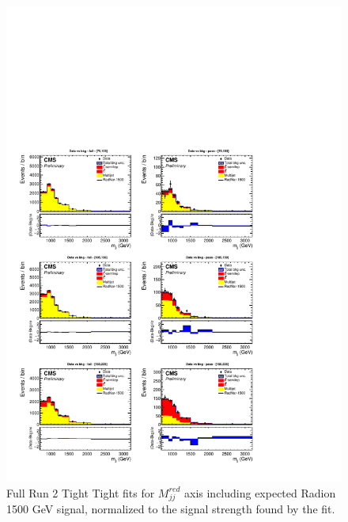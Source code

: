 \begin{figure}[!htb]
	\centering
	\includegraphics[width=1\textwidth]{Figures/postfit_projy_fits_TT.pdf}
	\caption{Full Run 2 Tight Tight fits for $M_{jj}^{red}$ axis including expected Radion 1500 GeV signal, normalized to the signal strength found by the fit.}
	\label{fig:TTmjj}
\end{figure}
